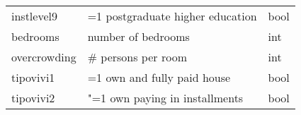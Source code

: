 \documentclass[11pt]{article}
\begin{document}
\begin{longtable}[]{@{}lll@{}}
\begin{minipage}[t]{0.19\columnwidth}\raggedright\strut
instlevel9\strut
\end{minipage} & \begin{minipage}[t]{0.16\columnwidth}\raggedright\strut
=1 postgraduate higher education\strut
\end{minipage} & \begin{minipage}[t]{0.24\columnwidth}\raggedright\strut
bool\strut
\end{minipage}\tabularnewline
\begin{minipage}[t]{0.19\columnwidth}\raggedright\strut
bedrooms\strut
\end{minipage} & \begin{minipage}[t]{0.16\columnwidth}\raggedright\strut
number of bedrooms\strut
\end{minipage} & \begin{minipage}[t]{0.24\columnwidth}\raggedright\strut
int\strut
\end{minipage}\tabularnewline
\begin{minipage}[t]{0.19\columnwidth}\raggedright\strut
overcrowding\strut
\end{minipage} & \begin{minipage}[t]{0.16\columnwidth}\raggedright\strut
\# persons per room\strut
\end{minipage} & \begin{minipage}[t]{0.24\columnwidth}\raggedright\strut
int\strut
\end{minipage}\tabularnewline
\begin{minipage}[t]{0.19\columnwidth}\raggedright\strut
tipovivi1\strut
\end{minipage} & \begin{minipage}[t]{0.16\columnwidth}\raggedright\strut
=1 own and fully paid house\strut
\end{minipage} & \begin{minipage}[t]{0.24\columnwidth}\raggedright\strut
bool\strut
\end{minipage}\tabularnewline
\begin{minipage}[t]{0.19\columnwidth}\raggedright\strut
tipovivi2\strut
\end{minipage} & \begin{minipage}[t]{0.16\columnwidth}\raggedright\strut
"=1 own paying in installments\strut
\end{minipage} & \begin{minipage}[t]{0.24\columnwidth}\raggedright\strut
bool\strut
\end{minipage}\tabularnewline

\end{longtable}
\end{document}
